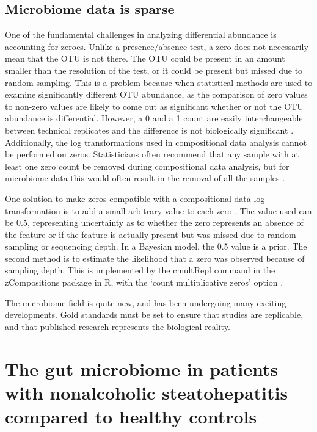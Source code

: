 \subsection{Microbiome data is sparse}
One of the fundamental challenges in analyzing differential abundance is accounting for zeroes. Unlike a presence/absence test, a zero does not necessarily mean that the OTU is not there. The OTU could be present in an amount smaller than the resolution of the test, or it could be present but missed due to random sampling. This is a problem because when statistical methods are used to examine significantly different OTU abundance, as the comparison of zero values to non-zero values are likely to come out as significant whether or not the OTU abundance is differential. However, a 0 and a 1 count are easily interchangeable between technical replicates and the difference is not biologically significant \cite{gloor2016s} \cite{fernandes2013anova} \cite{fernandes2014unifying}. Additionally, the log transformations used in compositional data analysis cannot be performed on zeros. Statisticians often recommend that any sample with at least one zero count be removed during compositional data analysis, but for microbiome data this would often result in the removal of all the samples \cite{aitchison1982statistical}.

One solution to make zeros compatible with a compositional data log transformation is to add a small arbitrary value to each zero \cite{aitchison1982statistical}. The value used can be 0.5, representing uncertainty as to whether the zero represents an absence of the feature or if the feature is actually present but was missed due to random sampling or sequencing depth. In a Bayesian model, the 0.5 value is a prior. The second method is to estimate the likelihood that a zero was observed because of sampling depth. This is implemented by the cmultRepl command in the zCompositions package in R, with the `count multiplicative zeros' option \cite{palarea2015zcompositions}.

The microbiome field is quite new, and has been undergoing many exciting developments. Gold standards must be set to ensure that studies are replicable, and that published research represents the biological reality.

\section{The gut microbiome in patients with nonalcoholic steatohepatitis compared to healthy controls}

